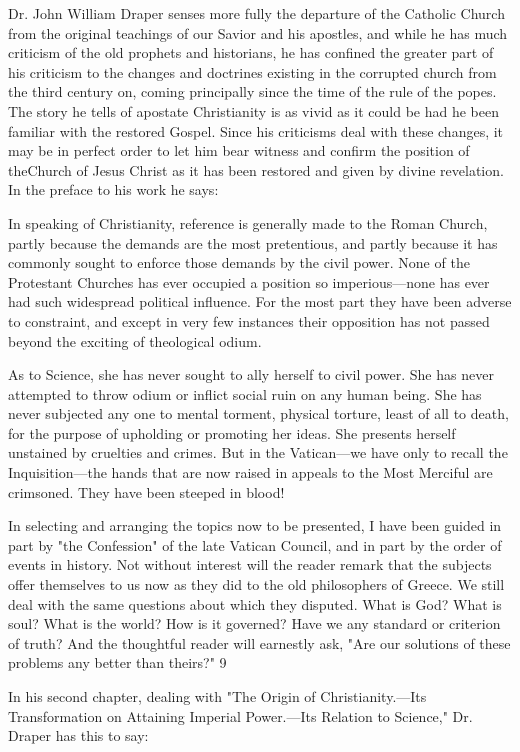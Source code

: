 Dr. John William Draper senses more fully the departure of the Catholic Church from the
original teachings of our Savior and his apostles, and while he has much criticism of the old
prophets and historians, he has confined the greater part of his criticism to the changes and
doctrines existing in the corrupted church from the third century on, coming principally since
the time of the rule of the popes. The story he tells of apostate Christianity is as vivid as it
could be had he been familiar with the restored Gospel. Since his criticisms deal with these
changes, it may be in perfect order to let him bear witness and confirm the position of theChurch of Jesus Christ as it has been restored and given by divine revelation. In the preface
to his work he says:

In speaking of Christianity, reference is generally made to the Roman Church, partly because
the demands are the most pretentious, and partly because it has commonly sought to enforce
those demands by the civil power. None of the Protestant Churches has ever occupied a
position so imperious—none has ever had such widespread political influence. For the most
part they have been adverse to constraint, and except in very few instances their opposition
has not passed beyond the exciting of theological odium.

As to Science, she has never sought to ally herself to civil power. She has never attempted to
throw odium or inflict social ruin on any human being. She has never subjected any one to
mental torment, physical torture, least of all to death, for the purpose of upholding or
promoting her ideas. She presents herself unstained by cruelties and crimes. But in the
Vatican—we have only to recall the Inquisition—the hands that are now raised in appeals to
the Most Merciful are crimsoned. They have been steeped in blood!

In selecting and arranging the topics now to be presented, I have been guided in part by "the
Confession" of the late Vatican Council, and in part by the order of events in history. Not
without interest will the reader remark that the subjects offer themselves to us now as they
did to the old philosophers of Greece. We still deal with the same questions about which they
disputed. What is God? What is soul? What is the world? How is it governed? Have we any
standard or criterion of truth? And the thoughtful reader will earnestly ask, "Are our solutions
of these problems any better than theirs?" 9

In his second chapter, dealing with "The Origin of Christianity.—Its Transformation on
Attaining Imperial Power.—Its Relation to Science," Dr. Draper has this to say:


